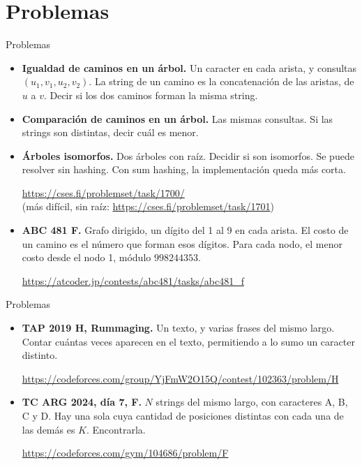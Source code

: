 \section{Problemas}

\begin{frame}{Problemas}
  \begin{itemize}
    \item \textbf{Igualdad de caminos en un árbol.}
      Un caracter en cada arista, y consultas \((u_1,v_1,u_2,v_2)\).
      La string de un camino es la concatenación de las aristas, de \(u\) a \(v\).
      Decir si los dos caminos forman la misma string.

    \item \textbf{Comparación de caminos en un árbol.}
      Las mismas consultas.
      Si las strings son distintas, decir cuál es menor.

    \item \textbf{Árboles isomorfos.}
      Dos árboles con raíz. Decidir si son isomorfos.
      Se puede resolver sin hashing.
      Con sum hashing, la implementación queda más corta.

      {\footnotesize \url{https://cses.fi/problemset/task/1700/}}\\
      {\footnotesize (más difícil, sin raíz: \url{https://cses.fi/problemset/task/1701})}

    \item \textbf{ABC 481 F.}
      Grafo dirigido, un dígito del 1 al 9 en cada arista.
      El costo de un camino es el número que forman esos dígitos.
      Para cada nodo, el menor costo desde el nodo 1, módulo \(998244353\).

      {\footnotesize \url{https://atcoder.jp/contests/abc481/tasks/abc481_f}}
  \end{itemize}
\end{frame}

\begin{frame}{Problemas}
  \begin{itemize}
    \item \textbf{TAP 2019 H, Rummaging.}
      Un texto, y varias frases del mismo largo.
      Contar cuántas veces aparecen en el texto, permitiendo a lo sumo un caracter distinto.

      {\footnotesize \url{https://codeforces.com/group/YjFmW2O15Q/contest/102363/problem/H}}

    \item \textbf{TC ARG 2024, día 7, F.}
      \(N\) strings del mismo largo, con caracteres A, B, C y D.
      Hay una sola cuya cantidad de posiciones distintas con cada una de las demás es \(K\).
      Encontrarla.

      {\footnotesize \url{https://codeforces.com/gym/104686/problem/F}}
  \end{itemize}
\end{frame}

